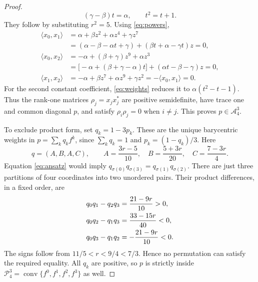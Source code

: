 \documentclass[11pt]{article}
\newcommand{\A}{\mathcal A}
\newcommand{\Pp}{\mathcal P}
\begin{document}
\begin{proof}
\begin{equation}
 (\gamma-\beta)t=\alpha,\qquad t^2=t+1.
\end{equation}
They follow by substituting $r^2=5$. Using \eqref{eq:powers},
\begin{align*}
 \langle x_0,x_1\rangle
 &=\alpha+\beta z^2+\alpha z^4+\gamma z^7\\
 &=(\alpha-\beta-\alpha t+\gamma)
   +(\beta t+\alpha-\gamma t)z=0,\\
 \langle x_0,x_2\rangle
 &=-\alpha+(\beta+\gamma)z^9+\alpha z^3\\
 &=\bigl[-\alpha+(\beta+\gamma-\alpha)t\bigr]
   +(\alpha t-\beta-\gamma)z=0,\\
 \langle x_1,x_2\rangle
 &=-\alpha+\beta z^7+\alpha z^9+\gamma z^2
   =-\langle x_0,x_1\rangle=0.
\end{align*}
For the second constant coefficient, \eqref{eq:weights} reduces it to
$\alpha(t^2-t-1)$. Thus the rank-one matrices
$\rho_j=x_jx_j^*$ are positive semidefinite, have trace one and common
diagonal $p$, and satisfy $\rho_i\rho_j=0$ when $i\ne j$.
This proves $p\in\A_4^3$.

To exclude product form, set $q_k=1-3p_k$. These are the unique barycentric
weights in $p=\sum_k q_k f^k$, since $\sum_kq_k=1$ and
$p_k=(1-q_k)/3$. Here
\begin{equation}\label{eq:q}
 q=(A,B,A,C),\qquad
 A=\frac{3r-5}{10},\quad B=\frac{5+3r}{20},\quad
 C=\frac{7-3r}{4}.
\end{equation}
Equation \eqref{eq:ansatz} would imply
$q_{\sigma(0)}q_{\sigma(3)}=q_{\sigma(1)}q_{\sigma(2)}$.
There are just three partitions of four coordinates into two unordered
pairs. Their product differences, in a fixed order, are
\begin{align}\label{eq:gaps}
 q_0q_1-q_2q_3&=\frac{21-9r}{10}>0,\notag\\
 q_0q_2-q_1q_3&=\frac{33-15r}{40}<0,\\
 q_0q_3-q_1q_2&=-\frac{21-9r}{10}<0.\notag
\end{align}
The signs follow from $11/5<r<9/4<7/3$. Hence no permutation can
satisfy the required equality. All $q_k$ are positive, so $p$ is strictly
inside $\Pp_4^3=\operatorname{conv}\{f^0,f^1,f^2,f^3\}$ as well.
\end{proof}
\end{document}

